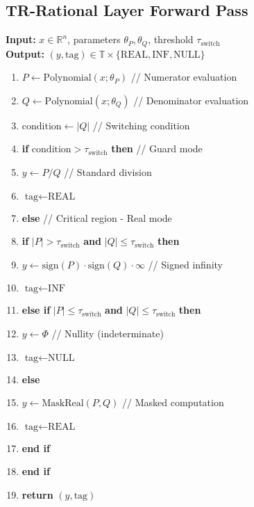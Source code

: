 \documentclass[twoside,11pt]{article}
\begin{document}
\subsection{TR-Rational Layer Forward Pass}

\begin{tcolorbox}[colback=gray!5!white,colframe=gray!75!black,title=\textbf{Algorithm 1: TR-Rational Layer Forward Pass}]
\textbf{Input:} $x \in \mathbb{R}^n$, parameters $\theta_P, \theta_Q$, threshold $\tau_{\text{switch}}$ \\
\textbf{Output:} $(y, \text{tag}) \in \mathbb{T} \times \{\text{REAL}, \text{INF}, \text{NULL}\}$

\begin{enumerate}
\item $P \leftarrow \text{Polynomial}(x; \theta_P)$ \hfill // Numerator evaluation
\item $Q \leftarrow \text{Polynomial}(x; \theta_Q)$ \hfill // Denominator evaluation  
\item $\text{condition} \leftarrow |Q|$ \hfill // Switching condition
\item \textbf{if} $\text{condition} > \tau_{\text{switch}}$ \textbf{then} \hfill // Guard mode
\item \quad $y \leftarrow P / Q$ \hfill // Standard division
\item \quad $\text{tag} \leftarrow \text{REAL}$
\item \textbf{else} \hfill // Critical region - Real mode
\item \quad \textbf{if} $|P| > \tau_{\text{switch}}$ \textbf{and} $|Q| \leq \tau_{\text{switch}}$ \textbf{then}
\item \quad \quad $y \leftarrow \text{sign}(P) \cdot \text{sign}(Q) \cdot \infty$ \hfill // Signed infinity
\item \quad \quad $\text{tag} \leftarrow \text{INF}$
\item \quad \textbf{else if} $|P| \leq \tau_{\text{switch}}$ \textbf{and} $|Q| \leq \tau_{\text{switch}}$ \textbf{then}
\item \quad \quad $y \leftarrow \Phi$ \hfill // Nullity (indeterminate)
\item \quad \quad $\text{tag} \leftarrow \text{NULL}$
\item \quad \textbf{else}
\item \quad \quad $y \leftarrow \text{MaskReal}(P, Q)$ \hfill // Masked computation
\item \quad \quad $\text{tag} \leftarrow \text{REAL}$
\item \quad \textbf{end if}
\item \textbf{end if}
\item \textbf{return} $(y, \text{tag})$
\end{enumerate}
\end{tcolorbox}
\end{document}
